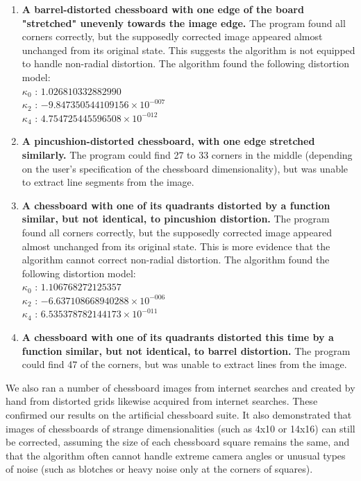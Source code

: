 \begin{enumerate}
  \item \textbf{A barrel-distorted chessboard with one edge of the board "stretched" unevenly towards the image edge.} The program found all corners correctly, but the supposedly corrected image appeared almost unchanged from its original state. This suggests the algorithm is not equipped to handle non-radial distortion. The algorithm found the following distortion model:\\
   $ \kappa_{0}$ : $1.026810332882990$\\
   $ \kappa_{2}$ : $-9.847350544109156 \times 10^{-007}$\\
   $ \kappa_{4}$ : $4.754725445596508 \times 10^{-012}$
  \item \textbf{A pincushion-distorted chessboard, with one edge stretched similarly.} The program could find 27 to 33 corners in the middle (depending on the user's specification of the chessboard dimensionality), but was unable to extract line segments from the image.
  \item \textbf{A chessboard with one of its quadrants distorted by a function similar, but not identical, to pincushion distortion.} The program found all corners correctly, but the supposedly corrected image appeared almost unchanged from its original state. This is more evidence that the algorithm cannot correct non-radial distortion. The algorithm found the following distortion model:\\
   $ \kappa_{0}$ : $1.106768272125357$\\
   $ \kappa_{2}$ : $-6.637108668940288 \times 10^{-006}$\\
   $ \kappa_{4}$ : $6.535378782144173 \times 10^{-011}$
  \item \textbf{A chessboard with one of its quadrants distorted this time by a function similar, but not identical, to barrel distortion.} The program could find 47 of the corners, but was unable to extract lines from the image.
\end{enumerate}

We also ran a number of chessboard images from internet searches and created by hand from distorted grids likewise acquired from internet searches. These confirmed our results on the artificial chessboard suite. It also demonstrated that images of chessboards of strange dimensionalities (such as 4x10 or 14x16) can still be corrected, assuming the size of each chessboard square remains the same, and that the algorithm often cannot handle extreme camera angles or unusual types of noise (such as blotches or heavy noise only at the corners of squares).

